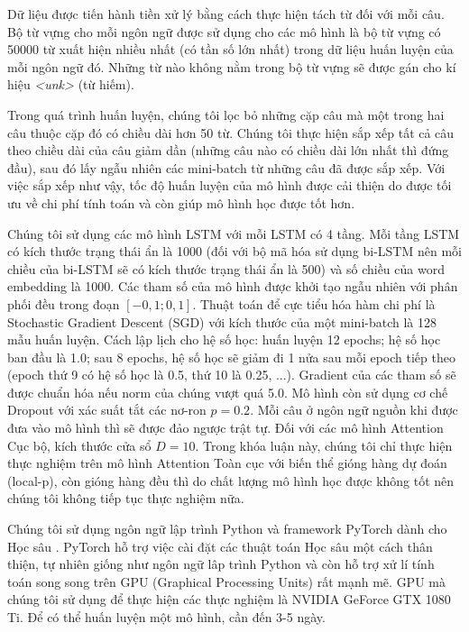 Dữ liệu được tiến hành tiền xử lý bằng cách thực hiện tách từ đối với mỗi câu. Bộ từ vựng cho mỗi ngôn ngữ được sử dụng cho các mô hình là bộ từ vựng có 50000 từ xuất hiện nhiều nhất (có tần số lớn nhất) trong dữ liệu huấn luyện của mỗi ngôn ngữ đó. Những từ nào không nằm trong bộ từ vựng sẽ được gán cho kí hiệu \textit{<unk>} (từ hiếm).

Trong quá trình huấn luyện, chúng tôi lọc bỏ những cặp câu mà một trong hai câu thuộc cặp đó có chiều dài hơn 50 từ. Chúng tôi thực hiện sắp xếp tất cả câu theo chiều dài của câu giảm dần (những câu nào có chiều dài lớn nhất thì đứng đầu), sau đó lấy ngẫu nhiên các mini-batch từ những câu đã được sắp xếp. Với việc sắp xếp như vậy, tốc độ huấn luyện của mô hình được cải thiện do được tối ưu về chi phí tính toán và còn giúp mô hình học được tốt hơn.

Chúng tôi sử dụng các mô hình LSTM với mỗi LSTM có 4 tầng. Mỗi tầng LSTM có kích thước trạng thái ẩn là 1000 (đối với bộ mã hóa sử dụng bi-LSTM nên mỗi chiều của bi-LSTM sẽ có kích thước trạng thái ẩn là 500) và số chiều của word embedding là 1000. Các tham số của mô hình được khởi tạo ngẫu nhiên với phân phối đều trong đoạn $[-0,1; 0,1]$. Thuật toán để cực tiểu hóa hàm chi phí là Stochastic Gradient Descent (SGD) với kích thước của một mini-batch là 128 mẫu huấn luyện. Cách lập lịch cho hệ số học: huấn luyện 12 epochs; hệ số học ban đầu là 1.0; sau 8 epochs, hệ số học sẽ giảm đi 1 nửa sau mỗi epoch tiếp theo (epoch thứ 9 có hệ số học là 0.5, thứ 10 là 0.25, ...). Gradient của các tham số sẽ được chuẩn hóa nếu norm của chúng vượt quá 5.0. Mô hình còn sử dụng cơ chế Dropout với xác suất tắt các nơ-ron $p = 0.2$. Mỗi câu ở ngôn ngữ nguồn khi được đưa vào mô hình thì sẽ được đảo ngược trật tự. Đối với các mô hình Attention Cục bộ, kích thước cửa sổ $D = 10$. Trong khóa luận này, chúng tôi chỉ thực hiện thực nghiệm trên mô hình Attention Toàn cục với biến thể gióng hàng dự đoán (local-p), còn gióng hàng đều thì do chất lượng mô hình học được không tốt nên chúng tôi không tiếp tục thực nghiệm nữa.

Chúng tôi sử dụng ngôn ngữ lập trình Python và framework PyTorch dành cho Học sâu \cite{pytorchworkshop}. PyTorch hỗ trợ việc cài đặt các thuật toán Học sâu một cách thân thiện, tự nhiên giống như ngôn ngữ lâp trình Python và còn hỗ trợ xử lí tính toán song song trên GPU (Graphical Processing Units) rất mạnh mẽ. GPU mà chúng tôi sử dụng để thực hiện các thực nghiệm là NVIDIA GeForce GTX 1080 Ti. Để có thể huấn luyện một mô hình, cần đến 3-5 ngày.

